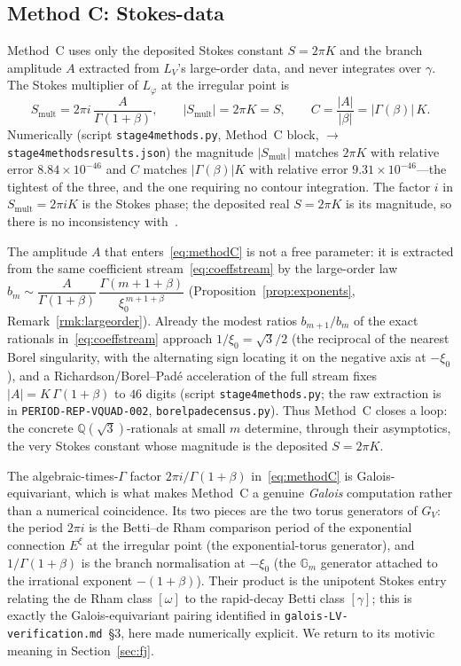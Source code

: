 \documentclass[11pt,reqno]{amsart}
\renewcommand{\_}{\vquadorigunderscore\allowbreak}
\theoremstyle{plain}
\theoremstyle{definition}
\newcommand{\Lphi}{L_{\varphi}}
\newcommand{\LV}{L_{V}}
\newcommand{\Qsqrt}{\mathbb{Q}(\sqrt3)}
\newcommand{\xizero}{\xi_0}
\newcommand{\Gm}{\mathbb{G}_m}
\providecommand{\C}{}\renewcommand{\C}{C}
\begin{document}
\subsection{Method C: Stokes-data}\label{sub:methodC}
Method~C uses only the deposited Stokes constant $S=2\pi K$ and the branch amplitude $A$ extracted
from $\LV$'s large-order data, and never integrates over $\gamma$. The Stokes multiplier of
$\Lphi$ at the irregular point is
\begin{equation}\label{eq:methodC}
  S_{\mathrm{mult}}=2\pi i\,\frac{A}{\Gamma(1+\beta)},\qquad
  \lvert S_{\mathrm{mult}}\rvert=2\pi K=S,\qquad
  \C=\frac{\lvert A\rvert}{\lvert\beta\rvert}=\lvert\Gamma(\beta)\rvert\,K .
\end{equation}
Numerically (script \texttt{stage4\_methods.py}, Method~C block, $\to$ \texttt{stage4\_methods\_results.json})
the magnitude $\lvert S_{\mathrm{mult}}\rvert$ matches $2\pi K$ with relative error
$8.84\times10^{-46}$ and $\C$ matches $\lvert\Gamma(\beta)\rvert K$ with relative error
$9.31\times10^{-46}$---the tightest of the three, and the one requiring no contour integration.
The factor $i$ in $S_{\mathrm{mult}}=2\pi iK$ is the Stokes phase; the deposited real
$S=2\pi K$ is its magnitude, so there is no inconsistency with~\cite{Vquad,StokesNote}.

The amplitude $A$ that enters~\eqref{eq:methodC} is not a free parameter: it is extracted from the
same coefficient stream~\eqref{eq:coeffstream} by the large-order law
$b_m\sim \dfrac{A}{\Gamma(1+\beta)}\,\dfrac{\Gamma(m+1+\beta)}{\xizero^{\,m+1+\beta}}$
(Proposition~\ref{prop:exponents}, Remark~\ref{rmk:largeorder}). Already the modest ratios
$b_{m+1}/b_m$ of the exact rationals in~\eqref{eq:coeffstream} approach $1/\xizero=\sqrt3/2$ (the
reciprocal of the nearest Borel singularity, with the alternating sign locating it on the negative
axis at $-\xizero$), and a Richardson/Borel--Pad\'e acceleration of the full stream fixes
$\lvert A\rvert=K\,\Gamma(1+\beta)$ to $46$ digits (script \texttt{stage4\_methods.py}; the raw
extraction is in \texttt{PERIOD-REP-VQUAD-002}, \texttt{borel\_pade\_census.py}). Thus Method~C
closes a loop: the concrete $\Qsqrt$-rationals at small $m$ determine, through their asymptotics,
the very Stokes constant whose magnitude is the deposited $S=2\pi K$.

The algebraic-times-$\Gamma$ factor $2\pi i/\Gamma(1+\beta)$ in~\eqref{eq:methodC} is
Galois-equivariant, which is what makes Method~C a genuine \emph{Galois} computation rather than a
numerical coincidence. Its two pieces are the two torus generators of $G_V$: the period $2\pi i$ is
the Betti--de Rham comparison period of the exponential connection $E^{\xi}$ at the irregular point
(the exponential-torus generator), and $1/\Gamma(1+\beta)$ is the branch normalisation at
$-\xizero$ (the $\Gm$ generator attached to the irrational exponent $-(1+\beta)$). Their product is
the unipotent Stokes entry relating the de Rham class $[\omega]$ to the rapid-decay Betti class
$[\gamma]$; this is exactly the Galois-equivariant pairing identified in
\texttt{galois-LV-verification.md}~\S3, here made numerically explicit. We return to its motivic
meaning in Section~\ref{sec:fj}.
\end{document}
